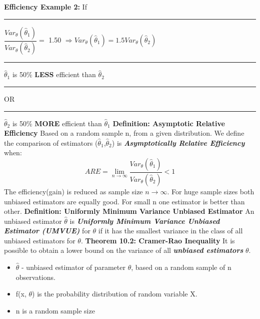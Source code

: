 \documentclass[]{article}
\begin{document}
\newline
\newline
\textbf{Efficiency Example 2:}  If \Large\rule{.3cm}{0pt}$\dfrac{  Var_\theta (\hat\theta_1)  }{ Var_\theta (\hat\theta_2)}  = $  1.50 $\Longrightarrow  Var_\theta (\hat\theta_1) = 1.5  Var_\theta (\hat\theta_2) $ 
\newline\newline\Large\rule{10cm}{0pt}  $\hat\theta_1$ is 50\% \textbf{LESS} efficient than $\hat\theta_2$
\newline\Large\rule{13cm}{0pt}   OR
\newline\Large\rule{10cm}{0pt}  $\hat\theta_2$ is 50\% \textbf{MORE} efficient than $\hat\theta_1$
\newline
\newline
\newline
\newline
\Large\textbf{Definition: Asymptotic Relative Efficiency}
\newline
\Large Based on a random sample n, from a given distribution. We define the comparison of estimators ($\hat\theta_1$,$\hat\theta_2$) is \textbf{\textit{Asymptotically Relative Efficiency}}  when: \newline
\[ ARE = \lim_{n\to\infty}  \dfrac{  Var_\theta (\hat\theta_1)  }{ Var_\theta (\hat\theta_2)}  <  1 \] 
The efficiency(gain) is reduced as sample size ${n\to\infty}$. For huge sample sizes both unbiased estimators are equally good. For small n one estimator is better than other.
\newline
\newline
\Large\textbf{Definition: Uniformly Minimum Variance Unbiased Estimator}
\newline
\Large An unbiased estimator $\hat\theta$ is \textbf{\textit{Uniformly Minimum Variance Unbiased Estimator (UMVUE)}} for $\theta$ if it has the smallest variance in the class of all unbiased estimators for $\theta$.
\newline
\newline
\Large\textbf{Theorem 10.2: Cramer-Rao Inequality}
\newline
\Large It is possible to obtain a lower bound on the variance of all \textbf{\textit{unbiased estimators}} $\theta$.
\begin{itemize}
	\item $\hat\theta$ - unbiased estimator of parameter $\theta$, based on a random sample of n observations.
	\item f(x, $\theta$) is the probability distribution of random variable X.
	\item n is a random sample size
\end{itemize}
\end{document}
